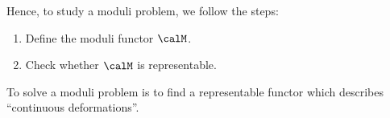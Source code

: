 




    Hence, to study a moduli problem, we follow the steps:
    \begin{enumerate}[label=\arabic*.]
        \item Define the moduli functor \(\calM\).
        \item Check whether \(\calM\) is representable.
    \end{enumerate}

    \begin{slogan}
        To solve a moduli problem is to find a representable functor which describes ``continuous deformations''.
    \end{slogan}

